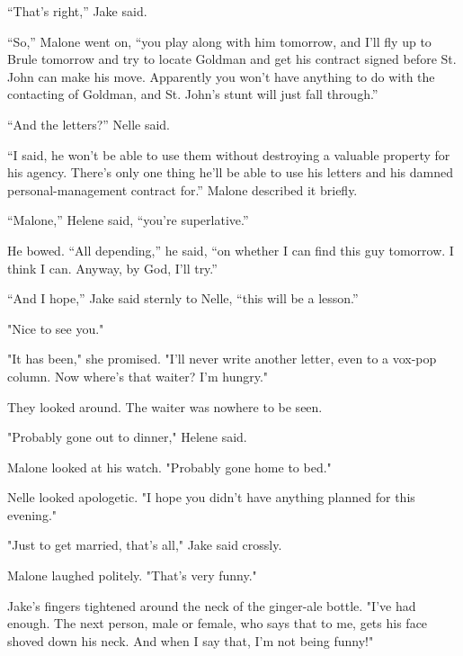 \documentclass{novel}
\begin{document}
“That’s right,” Jake said.

“So,” Malone went on, “you play along with him tomorrow, and I’ll fly up to Brule tomorrow and try to locate Goldman and get his contract signed before St. John can make his move. Apparently you won’t have anything to do with the contacting of Goldman, and St. John’s stunt will just fall through.”

“And the letters?” Nelle said.

“I said, he won’t be able to use them without destroying a valuable property for his agency. There’s only one thing he’ll be able to use his letters and his damned personal-management contract for.” Malone described it briefly.

“Malone,” Helene said, “you’re superlative.”

He bowed. “All depending,” he said, “on whether I can find this guy tomorrow. I think I can. Anyway, by God, I’ll try.”

“And I hope,” Jake said sternly to Nelle, “this will be a lesson.”

"Nice to see you."

"It has been," she promised. "I'll never write another letter, even to a vox-pop column. Now where's that waiter? I'm hungry."

They looked around. The waiter was nowhere to be seen.

"Probably gone out to dinner," Helene said.

Malone looked at his watch. "Probably gone home to bed."

Nelle looked apologetic. "I hope you didn't have anything planned for this evening."

"Just to get married, that's all," Jake said crossly.

Malone laughed politely. "That's very funny."

Jake's fingers tightened around the neck of the ginger-ale bottle. "I've had enough. The next person, male or female, who says that to me, gets his face shoved down his neck. And when I say that, I'm not being funny!"

\begin{ChapterStart}
\vspace{3\nbs}
\end{ChapterStart}
\end{document}
